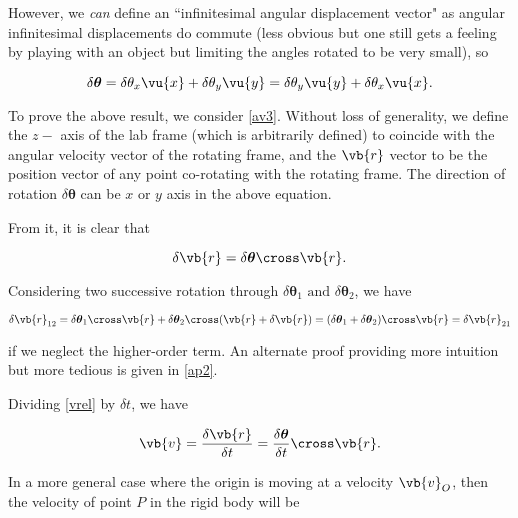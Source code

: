 \documentclass[a4paper,12pt]{report}
\begin{document}
However, we \emph{can} define an ``infinitesimal angular displacement vector" as angular infinitesimal displacements do commute (less obvious but one still gets a feeling by playing with an object but limiting the angles rotated to be very small), so 

\begin{equation}
	\delta \boldsymbol{\theta } = \delta \theta _{x} \vu{x} + \delta \theta _{y} \vu{y} = \delta \theta _{y} \vu{y} + \delta \theta _{x} \vu{x}  .
\end{equation}


To prove the above result, we consider \cref{av3}. Without loss of generality, we define the \(z-\) axis of the lab frame (which is arbitrarily defined) to coincide with the angular velocity vector of the rotating frame, and the \(\vb{r} \) vector to be the position vector of any point co-rotating with the rotating frame. The direction of rotation \(\delta \boldsymbol{\theta } \) can be \(x \text { or } y\) axis in the above equation.

 From it, it is clear that

\begin{equation}
	\delta \vb{r} = \delta \boldsymbol{\theta }  \cross \vb{r} . \label{vrel} 
\end{equation}

Considering two successive rotation through \(\delta \boldsymbol{\theta } _{1} \text{ and }  \delta \boldsymbol{\theta } _{2}  \), we have 

\begin{equation}
	\delta \vb{r} _{12} = \delta \boldsymbol{\theta } _{1} \cross \vb{r} + \delta \boldsymbol{\theta } _{2}  \cross (\vb{r} +\delta \vb{r} ) = (\delta \boldsymbol{\theta } _{1}  + \delta \boldsymbol{\theta } _{2}  ) \cross \vb{r} = \delta \vb{r} _{21}  
\end{equation}

if we neglect the higher-order term. An alternate proof providing more intuition but more tedious is given in \cref{ap2}.

Dividing \cref{vrel} by \(\delta t\), we have

\begin{equation}
	\vb{v} = \frac{\delta \vb{r}  }{\delta t} = \frac{\delta \boldsymbol{\theta } }{\delta t} \cross \vb{r} .
\end{equation}


In a more general case where the origin is moving at a velocity \(\vb{v} _{O} \), then the velocity of point \(P\) in the rigid body will be 
\end{document}
